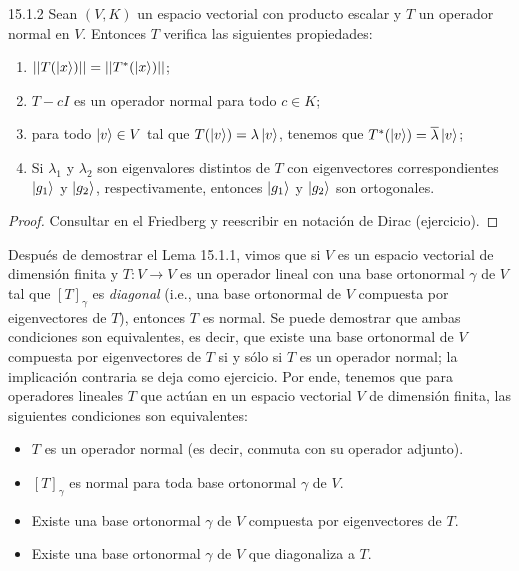 \documentclass[12pt,libertine]{book}
\begin{document}
\begin{Teo} {15.1.2}
    Sean $(V,K)$ un espacio vectorial con producto escalar y $T$ un operador normal en $V$. Entonces $T$ verifica las siguientes propiedades:

\begin{enumerate}[label=(\alph*)]
    \item $||T(\ket{x})||=||T^*(\ket{x})||$;
    \item $T-cI$ es un operador normal para todo $c\in K$;
    \item para todo $\ket{v}\in V$ tal que $T(\ket{v})=\lambda \ket{v}$, tenemos que $T^*(\ket{v})=\overline{\lambda}\ket{v}$;
    \item Si $\lambda_1$ y $\lambda_2$ son eigenvalores distintos de $T$ con eigenvectores correspondientes $\ket{g_1}$ y $\ket{g_2}$, respectivamente, entonces $\ket{g_1}$ y $\ket{g_2}$ son ortogonales.
\end{enumerate}

\begin{proof}
    Consultar en el Friedberg y reescribir en notación de Dirac (ejercicio).

    \iffalse


    (a)

    \vspace{3mm}
    (b)

    \vspace{3mm}
    (c) 

    \vspace{3mm}
    (d)


    \fi


\end{proof}
\end{Teo}

\vspace{3mm}
Después de demostrar el Lema 15.1.1, vimos que si $V$ es un espacio vectorial de dimensión finita y $T:V\to V$ es un operador lineal con una base ortonormal $\gamma$ de $V$ tal que $[T]_\gamma$ es \emph{diagonal} (i.e., una base ortonormal de $V$ compuesta por eigenvectores de $T$), entonces $T$ es normal. Se puede demostrar que ambas condiciones son equivalentes, es decir, que existe una base ortonormal de $V$ compuesta por eigenvectores de $T$ si y sólo si $T$ es un operador normal; la implicación contraria se deja como ejercicio. Por ende, tenemos que para operadores lineales $T$ que actúan en un espacio vectorial $V$ de dimensión finita, las siguientes condiciones son equivalentes:

\begin{itemize}
    \item $T$ es un operador normal (es decir, conmuta con su operador adjunto).
    \item $[T]_\gamma$ es normal para toda base ortonormal $\gamma$ de $V$. 
    \item Existe una base ortonormal $\gamma$ de $V$ compuesta por eigenvectores de $T$.
    \item Existe una base ortonormal $\gamma$ de $V$ que diagonaliza a $T$.
\end{itemize}
\end{document}
